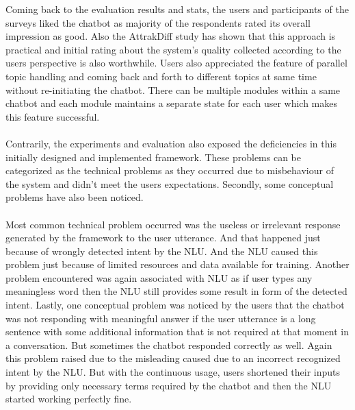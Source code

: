 Coming back to the evaluation results and stats, the users and participants of the surveys liked the chatbot as majority of the respondents rated its overall impression as good. Also the AttrakDiff study has shown that this approach is practical and initial rating about the system's quality collected according to the users perspective is also worthwhile. Users also appreciated the feature of parallel topic handling and coming back and forth to different topics at same time without re-initiating the chatbot. There can be multiple modules within a same chatbot and each module maintains a separate state for each user which makes this feature successful.
\\~\\
Contrarily, the experiments and evaluation also exposed the deficiencies in this initially designed and implemented framework. These problems can be categorized as the technical problems as they occurred due to misbehaviour of the system and didn't meet the users expectations. Secondly, some conceptual problems have also been noticed.
\\~\\
Most common technical problem occurred was the useless or irrelevant response generated by the framework to the user utterance. And that happened just because of wrongly detected intent by the NLU. And the NLU caused this problem just because of limited resources and data available for training. Another problem encountered was again associated with NLU as if user types any meaningless word then the NLU still provides some result in form of the detected intent. Lastly, one conceptual problem was noticed by the users that the chatbot was not responding with meaningful answer if the user utterance is a long sentence with some additional information that is not required at that moment in a conversation. But sometimes the chatbot responded correctly as well. Again this problem raised due to the misleading caused due to an incorrect recognized intent by the NLU. But with the continuous usage, users shortened their inputs by providing only necessary terms required by the chatbot and then the NLU started working perfectly fine.

